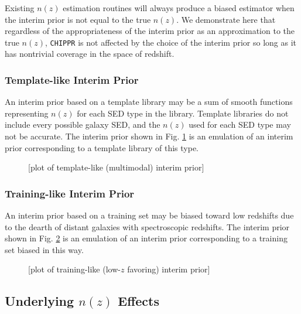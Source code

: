 \documentclass[iop]{emulateapj}
\newcommand{\chippr}{\texttt{CHIPPR} }
\begin{document}
Existing $n(z)$ estimation routines will always produce a biased estimator when the interim prior is not equal to the true $n(z)$.  We demonstrate here that regardless of the appropriateness of the interim prior as an approximation to the true $n(z)$, \chippr is not affected by the choice of the interim prior so long as it has nontrivial coverage in the space of redshift.

\subsubsection{Template-like Interim Prior}
\label{sec:tempintpr}

An interim prior based on a template library may be a sum of smooth functions representing $n(z)$ for each SED type in the library.  Template libraries do not include every possible galaxy SED, and the $n(z)$ used for each SED type may not be accurate.  The interim prior shown in Fig. \ref{fig:tempintpr} is an emulation of an interim prior corresponding to a template library of this type.

\begin{figure}
	\begin{center}
		\caption{[plot of template-like (multimodal) interim prior]}
		\label{fig:tempintpr}
	\end{center}
\end{figure}

\subsubsection{Training-like Interim Prior}
\label{sec:trainintpr}

An interim prior based on a training set may be biased toward low redshifts due to the dearth of distant galaxies with spectroscopic redshifts.  The interim prior shown in Fig. \ref{fig:trainintpr} is an emulation of an interim prior corresponding to a training set biased in this way.

\begin{figure}
	\begin{center}
		\caption{[plot of training-like (low-$z$ favoring) interim prior]}
		\label{fig:trainintpr}
	\end{center}
\end{figure}

\subsection{Underlying $n(z)$ Effects}
\label{sec:truth}
\end{document}
